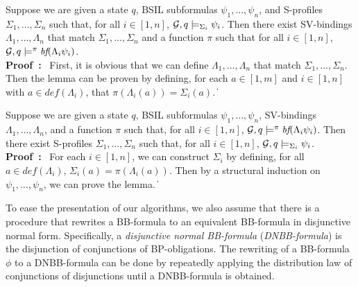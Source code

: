 \documentclass[11pt]{article}
\newcommand{\embf}{\textit{bf}}
\newcommand{\emdef}{\textit{def}}
\newcommand{\calg}{{\cal G}}
\newcommand{\pf}{\noindent\mbox{\bf Proof : }}
\def\qed{\ifmmode\|\else{\unskip\nobreak\hfil
\penalty50\hskip1em\null\nobreak\hfil$\blacksquare$
\parfillskip=0pt\finalhyphendemerits=0\endgraf}\fi}
\begin{document}
{\lemma \label{lemma.bbf.fwd}
Suppose we are given a state $q$,
BSIL subformulas $\psi_1,\ldots,\psi_n$, and  
S-profiles $\Sigma_1,\ldots,\Sigma_n$ such that, 
for all $i\in[1,n]$, $\calg,q\models_{\Sigma_i}\psi_i$. 
Then there exist SV-bindings $\Lambda_1,\ldots,\Lambda_n$ that 
match $\Sigma_1,\ldots,\Sigma_n$ and a function $\pi$ such that 
for all $i\in[1,n]$, $\calg,q\models^\pi\embf(\Lambda_i\psi_i)$.  
} 
\\\pf 
First, it is obvious that we can define 
$\Lambda_1,\ldots,\Lambda_n$ that match $\Sigma_1,\ldots,\Sigma_n$.  
Then the lemma can be proven 
by defining, for each $a\in[1,m]$ and $i\in[1,n]$ 
with $a\in\emdef(\Lambda_i)$, that $\pi(\Lambda_i(a))=\Sigma_i(a)$.  
\qed 

{\lemma \label{lemma.bbf.bkd}
Suppose we are given a state $q$,
BSIL subformulas $\psi_1,\ldots,\psi_n$, 
SV-bindings $\Lambda_1,\ldots,\Lambda_n$, 
and a function $\pi$ such that, for all $i\in[1,n]$, 
$\calg,q\models^\pi\embf(\Lambda_i\psi_i)$.  
Then there exist S-profiles $\Sigma_1,\ldots,\Sigma_n$ 
such that, for all $i\in[1,n]$, $\calg,q\models_{\Sigma_i}\psi_i$. 
}
\\\pf 
For each $i\in[1,n]$, we can construct $\Sigma_i$ by 
defining, for all $a\in \emdef(\Lambda_i)$, 
$\Sigma_i(a)=\pi(\Lambda_i(a))$.  
Then by a structural induction on $\psi_1,\ldots,\psi_n$, 
we can prove the lemma.  
\qed 



To ease the presentation of our algorithms,
we also assume that there is a procedure that 
rewrites a BB-formula to an equivalent BB-formula in disjunctive normal 
form.  
Specifically, a {\em disjunctive normal BB-formula} 
({\em DNBB-formula}) is the disjunction of conjunctions of 
BP-obligations. 
The rewriting of a BB-formula $\phi$ to a DNBB-formula can be 
done by repeatedly applying the distribution law of conjunctions 
of disjunctions until 
a DNBB-formula is obtained.
\end{document}

